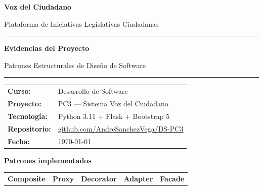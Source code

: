 \documentclass[12pt,a4paper]{article}
\begin{document}

\begin{titlepage}
  \centering
  \vspace*{2cm}
  {\Huge\bfseries\color{azulcongreso} Voz del Ciudadano \par}
  \vspace{0.5cm}
  {\large Plataforma de Iniciativas Legislativas Ciudadanas \par}
  \vspace{2cm}
  \rule{\linewidth}{1pt}
  \vspace{0.5cm}

  {\LARGE\bfseries Evidencias del Proyecto \par}
  \vspace{0.3cm}
  {\large Patrones Estructurales de Diseño de Software \par}

  \vspace{0.5cm}
  \rule{\linewidth}{1pt}
  \vspace{2cm}

  \begin{tabular}{ll}
    \textbf{Curso:}       & Desarrollo de Software \\[4pt]
    \textbf{Proyecto:}    & PC3 — Sistema Voz del Ciudadano \\[4pt]
    \textbf{Tecnología:}  & Python 3.11 + Flask + Bootstrap 5 \\[4pt]
    \textbf{Repositorio:} & \href{https://github.com/AndreSanchezVega/DS-PC3}{github.com/AndreSanchezVega/DS-PC3} \\[4pt]
    \textbf{Fecha:}       & \today \\
  \end{tabular}

  \vspace{2cm}
  {\large\bfseries Patrones implementados \par}
  \vspace{0.5cm}
  \begin{tabular}{ccccc}
    \textcolor{azulcongreso}{\textbf{Composite}} &
    \textcolor{azulcongreso}{\textbf{Proxy}} &
    \textcolor{azulcongreso}{\textbf{Decorator}} &
    \textcolor{azulcongreso}{\textbf{Adapter}} &
    \textcolor{azulcongreso}{\textbf{Facade}} \\
  \end{tabular}
\end{titlepage}
\end{document}
